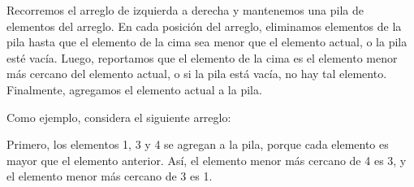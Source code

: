 Recorremos el arreglo de izquierda a derecha
y mantenemos una pila de elementos del arreglo.
En cada posición del arreglo, eliminamos elementos de la pila
hasta que el elemento de la cima sea menor que el
elemento actual, o la pila esté vacía.
Luego, reportamos que el elemento de la cima es
el elemento menor más cercano del elemento actual,
o si la pila está vacía, no hay tal elemento.
Finalmente, agregamos el elemento actual a la pila.

Como ejemplo, considera el siguiente arreglo:
\begin{center}
\end{center}

Primero, los elementos 1, 3 y 4 se agregan a la pila,
porque cada elemento es mayor que el elemento anterior.
Así, el elemento menor más cercano de 4 es 3,
y el elemento menor más cercano de 3 es 1.
\begin{center}
\end{center}

